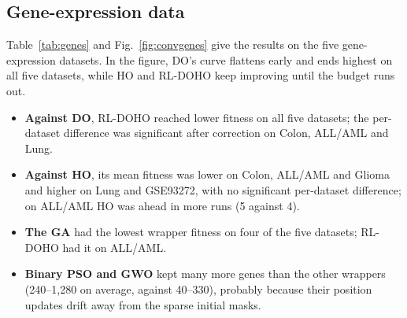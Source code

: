 \documentclass[journal]{IEEEtran}
\begin{document}
\subsection{Gene-expression data}
Table~\ref{tab:genes} and Fig.~\ref{fig:convgenes} give the results on the five gene-expression datasets. In the figure, DO's curve flattens early and ends highest on all five datasets, while HO and RL-DOHO keep improving until the budget runs out.
\begin{itemize}
\item \textbf{Against DO}, RL-DOHO reached lower fitness on all five datasets; the per-dataset difference was significant after correction on Colon, ALL/AML and Lung.
\item \textbf{Against HO}, its mean fitness was lower on Colon, ALL/AML and Glioma and higher on Lung and GSE93272, with no significant per-dataset difference; on ALL/AML HO was ahead in more runs (5 against 4).
\item \textbf{The GA} had the lowest wrapper fitness on four of the five datasets; RL-DOHO had it on ALL/AML.
\item \textbf{Binary PSO and GWO} kept many more genes than the other wrappers (240--1,280 on average, against 40--330), probably because their position updates drift away from the sparse initial masks.
\end{itemize}
\end{document}

